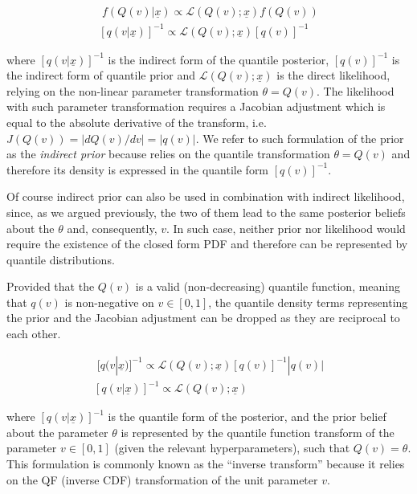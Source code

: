 \documentclass[
  12pt,
]{article}
\begin{document}
\[
\begin{gathered}\;
f(Q(v)|\underline{x}) \propto \mathcal{L}(Q(v);\underline{x})f(Q(v)) \\
[q(v|\underline{x})]^{-1} \propto \mathcal{L}(Q(v);\underline{x})[q(v)]^{-1}
\end{gathered}
\label{eq:bayesdqfdqfeq}
\]

where \([q(v|\underline{x})]^{-1}\) is the indirect form of the quantile posterior, \([q(v)]^{-1}\) is the indirect form of quantile prior and \(\mathcal{L}(Q(v);\underline{x})\) is the direct likelihood, relying on the non-linear parameter transformation \(\theta=Q(v)\). The likelihood with such parameter transformation requires a Jacobian adjustment which is equal to the absolute derivative of the transform, i.e.~\(J(Q(v))=|dQ(v)/dv|=|q(v)|\). We refer to such formulation of the prior as the \emph{indirect prior} because relies on the quantile transformation \(\theta=Q(v)\) and therefore its density is expressed in the quantile form \([q(v)]^{-1}\).

Of course indirect prior can also be used in combination with indirect likelihood, since, as we argued previously, the two of them lead to the same posterior beliefs about the \(\theta\) and, consequently, \(v\). In such case, neither prior nor likelihood would require the existence of the closed form PDF and therefore can be represented by quantile distributions.

Provided that the \(Q(v)\) is a valid (non-decreasing) quantile function, meaning that \(q(v)\) is non-negative on \(v \in [0,1]\), the quantile density terms representing the prior and the Jacobian adjustment can be dropped as they are reciprocal to each other.

\[ 
\begin{gathered}\;
[q(v|\underline{x})]^{-1} \propto \mathcal{L}(Q(v);\underline{x})[q(v)]^{-1}|q(v)| \\
[q(v|\underline{x})]^{-1} \propto \mathcal{L}(Q(v);\underline{x})
\end{gathered}
\label{eq:bayesidqfeq}
\]

where \([q(v|\underline{x})]^{-1}\) is the quantile form of the posterior, and the prior belief about the parameter \(\theta\) is represented by the quantile function transform of the parameter \(v \in [0,1]\) (given the relevant hyperparameters), such that \(Q(v)=\theta\). This formulation is commonly known as the ``inverse transform'' because it relies on the QF (inverse CDF) transformation of the unit parameter \(v\).
\end{document}
